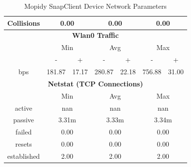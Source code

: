 \documentclass[11pt,a4paper,headinclude=false,footinclude=false]{scrreprt}
\begin{document}
\begin{table}[H]
\begin{tabular}{||c|c|c|c|c|c|c||}
    \hline
    Collisions & \multicolumn{2}{|c|}{0.00} & \multicolumn{2}{|c|}{0.00} & \multicolumn{2}{|c|}{0.00} \\
    \hline\hline
    \multicolumn{7}{|c|}{\textbf{Wlan0 Traffic}} \\
    \hline\hline
      & \multicolumn{2}{|c|}{Min} & \multicolumn{2}{|c|}{Avg} & \multicolumn{2}{|c|}{Max} \\
    \hline
      & - & + & - & + & - & + \\
    \hline
    bps  & 181.87 & 17.17 & 280.87 & 22.18 & 756.88 & 31.00 \\
    \hline\hline
    \multicolumn{7}{|c|}{\textbf{Netstat (TCP Connections)}} \\
    \hline\hline
      & \multicolumn{2}{|c|}{Min} & \multicolumn{2}{|c|}{Avg} & \multicolumn{2}{|c|}{Max} \\
    \hline
    active & \multicolumn{2}{|c|}{nan} & \multicolumn{2}{|c|}{nan} & \multicolumn{2}{|c|}{nan} \\
    \hline
    passive & \multicolumn{2}{|c|}{3.31m} & \multicolumn{2}{|c|}{3.33m} & \multicolumn{2}{|c|}{3.34m} \\
    \hline
    failed & \multicolumn{2}{|c|}{0.00} & \multicolumn{2}{|c|}{0.00} & \multicolumn{2}{|c|}{0.00} \\
    \hline
    resets & \multicolumn{2}{|c|}{0.00} & \multicolumn{2}{|c|}{0.00} & \multicolumn{2}{|c|}{0.00} \\
    \hline
    established & \multicolumn{2}{|c|}{2.00} & \multicolumn{2}{|c|}{2.00} & \multicolumn{2}{|c|}{2.00} \\
    \hline\hline
    \end{tabular}
    \caption{Mopidy SnapClient Device Network Parameters}
    \label{MopidyclientNetTab}
\end{table}
\end{document}
